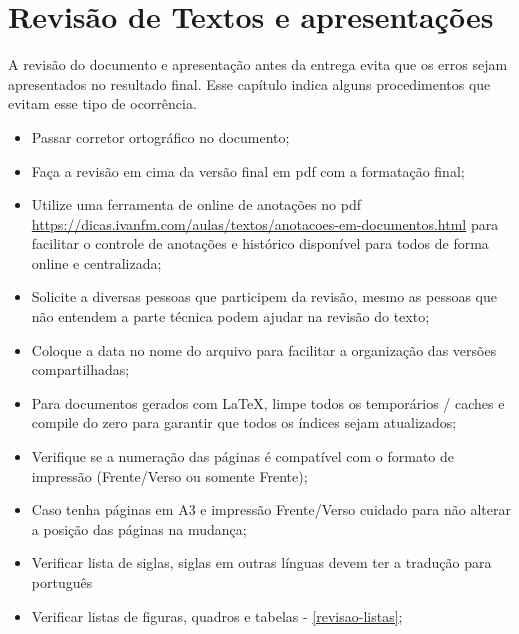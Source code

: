 \chapter{Revisão de Textos e apresentações}
\label{revisao-de-textos}


A revisão do documento e apresentação antes da entrega evita que os erros sejam apresentados no resultado final. Esse capítulo indica alguns procedimentos que evitam esse tipo de ocorrência.

\begin{itemize}
    \item Passar corretor ortográfico no documento;

    \item Faça a revisão em cima da versão final em \ac{pdf} com a formatação final;
    
    \item Utilize uma ferramenta de online de anotações no \ac{pdf} \url{https://dicas.ivanfm.com/aulas/textos/anotacoes-em-documentos.html} para facilitar o controle de anotações e histórico disponível para todos de forma online e centralizada;
    
    \item Solicite a diversas pessoas que participem da revisão, mesmo as pessoas que não entendem a parte técnica podem ajudar na revisão do texto;
    
    \item Coloque a data no nome do arquivo para facilitar a organização das versões compartilhadas;
    
    \item Para documentos gerados com \LaTeX, limpe todos os temporários / caches e compile do zero para garantir que todos os índices sejam atualizados;
    
    \item Verifique se a numeração das páginas é compatível com o formato de impressão (Frente/Verso ou somente Frente);
    
    \item Caso tenha páginas em A3 e impressão Frente/Verso cuidado para não alterar a posição das páginas na mudança;
    
    \item Verificar lista de siglas, siglas em outras línguas devem ter a tradução para português

    \item Verificar listas de figuras, quadros e tabelas - \autoref{revisao-listas};


\end{itemize}
